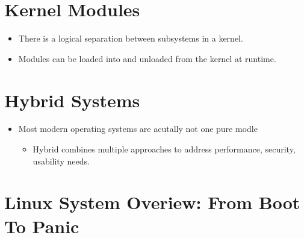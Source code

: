 \documentclass[]{article}
\begin{document}
\section{Kernel Modules}
\begin{itemize}
\item There is a logical separation between subsystems in a kernel.
\item Modules can be loaded into and unloaded from the kernel at runtime.
\end{itemize}

\section{Hybrid Systems}
\begin{itemize}
\item Most modern operating systems are acutally not one pure modle
\begin{itemize}
\item Hybrid combines multiple approaches to address performance, security,
usability needs.
\end{itemize}
\end{itemize}

\section{Linux System Overiew: From Boot To Panic}
\end{document}
